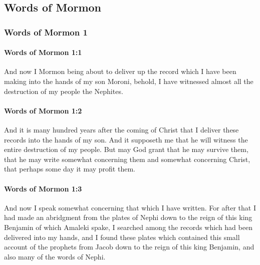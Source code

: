 \subsection{Words of Mormon}
	\label{WORDSOFMORMON}

	\subsubsection{Words of Mormon 1} %
		\label{WORDSOFMORMON-1}
	
		\paragraph{Words of Mormon 1:1} %
			\label{WORDSOFMORMON-1-1}

			And now I Mormon being about to deliver up the record
			which I have been making
			into the hands of my son Moroni,
			behold, I have witnessed almost all the destruction of my people the Nephites.

		\paragraph{Words of Mormon 1:2} %
			\label{WORDSOFMORMON-1-2}

			And it is many hundred years after the coming of Christ
			that I deliver these records into the hands of my son.
			And it supposeth me that he will witness the entire destruction of my people.
			But may God grant that he may survive them,
			that he may write somewhat concerning them
			and somewhat concerning Christ,
			that perhaps some day it may profit them.

		\paragraph{Words of Mormon 1:3} %
			\label{WORDSOFMORMON-1-3}

			And now I speak somewhat concerning that which I have written.
			For after that I had made an abridgment from the plates of Nephi
			down to the reign of this king Benjamin of which Amaleki spake,
			I searched among the records which had been delivered into my hands,
			and I found these plates which contained this small account of the prophets
			from Jacob down to the reign of this king Benjamin,
			and also many of the words of Nephi.

